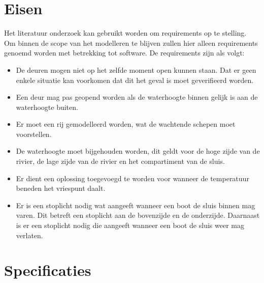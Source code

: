 \documentclass{article}
\begin{document}
\section{Eisen} %
Het literatuur onderzoek kan gebruikt worden om requirements op te stelling. Om binnen de scope van het modelleren te blijven zullen hier alleen requirements genoemd worden met betrekking tot software. De requirements zijn als volgt:
\begin{itemize}



\item De deuren mogen niet op het zelfde moment open kunnen staan. Dat er geen enkele situatie kan voorkomen dat dit het geval is moet geverifieerd worden.
\item Een deur mag pas geopend worden als de waterhoogte binnen gelijk is aan de waterhoogte buiten.
\item Er moet een rij gemodelleerd worden, wat de wachtende schepen moet voorstellen.
\item De waterhoogte moet bijgehouden worden, dit geldt voor de hoge zijde van de rivier, de lage zijde van de rivier en het compartiment van de sluis.
\item Er dient een oplossing toegevoegd te worden voor wanneer de temperatuur beneden het vriespunt daalt.
\item Er is een stoplicht nodig wat aangeeft wanneer een boot de sluis binnen mag varen. Dit betreft een stoplicht aan de bovenzijde en de onderzijde. Daarnaast is er een stoplicht nodig die aangeeft wanneer een boot de sluis weer mag verlaten.

\end{itemize}

\section{Specificaties} %
\end{document}
